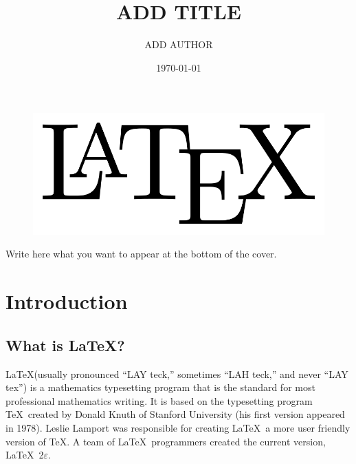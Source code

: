 \documentclass{article} %
\title{\LARGE\textbf{ADD TITLE}}
\date{\today} %
\author{ADD AUTHOR}
\begin{document}


\begin{titlepage} %



\begin{figure}[H]
\center 
\includegraphics[scale=0.5]{latex.png} %
\end{figure}

{\let\newpage\relax\maketitle} 

\vspace*{150px} %

\begin{small}
\begin{center}
Write here what you want to appear at the bottom of the cover.
\end{center}
\end{small}


\end{titlepage} %



\tableofcontents %
\listoffigures %
\listoftables %

\newpage 
\section{Introduction}
    \subsection{What is \LaTeX?}
    \quad \LaTeX (usually pronounced ``LAY teck,'' sometimes ``LAH teck,'' and never ``LAY tex'') is a mathematics typesetting program that is the standard for most professional mathematics writing. It is based on the typesetting program \TeX\ created by Donald Knuth of Stanford University (his first version appeared in 1978). Leslie Lamport was responsible for creating \LaTeX\, a more user friendly version of \TeX. A team of \LaTeX\ programmers created the current version,  \LaTeX\ 2$\varepsilon$.
    
\end{document}
